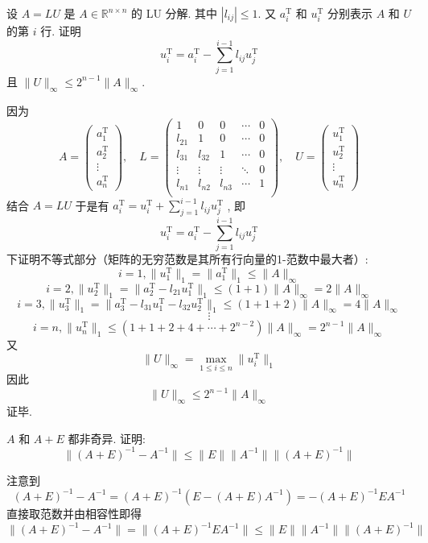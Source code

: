 \documentclass[12pt, answers]{exam}     %
\newcommand{\R}{\mathbb{R}}
\newcommand{\T}{\mathrm{T}}
\begin{document}
\begin{questions}
\question{}
设 \( A = LU \) 是 \( A \in \R^{n \times n} \) 的 LU 分解. 其中 \( |l_{ij}| \leq 1 \). 又 \( a_i^{\T} \) 和 \( u_i^{\T} \) 分别表示 \( A \) 和 \( U \) 的第 \( i \) 行. 证明
\[
u_i^{\T} = a_i^{\T} - \sum_{j=1}^{i-1} l_{ij} u_j^{\T}
\]
且 \( \|U\|_\infty \leq 2^{n-1} \|A\|_\infty \).

\begin{solution}
因为
\[
A = \begin{pmatrix}
a_1^{\T} \\
a_2^{\T} \\
\vdots \\
a_n^{\T}
\end{pmatrix},\quad
L = \begin{pmatrix}
1 & 0 & 0 & \cdots & 0 \\
l_{21} & 1 & 0 & \cdots & 0 \\
l_{31} & l_{32} & 1 & \cdots & 0 \\
\vdots & \vdots & \vdots & \ddots & 0 \\
l_{n1} & l_{n2} & l_{n3} & \cdots & 1 \\
\end{pmatrix},\quad
U = \begin{pmatrix}
u_1^{\T} \\
u_2^{\T} \\
\vdots \\
u_n^{\T}
\end{pmatrix}
\]
结合 \( A = LU \) 于是有
\( a_i^{\T} = u_i^{\T} + \sum_{j=1}^{i-1} l_{ij} u_j^{\T} \)
, 即
\[
u_i^{\T} = a_i^{\T} - \sum_{j=1}^{i-1} l_{ij} u_j^{\T}
\]
下证明不等式部分（矩阵的无穷范数是其所有行向量的1-范数中最大者）:
\[
i = 1, \|u_1^{\T}\|_1 = \|a_1^{\T}\|_1 \leq \|A\|_{\infty}
\]
\[
i = 2, \|u_2^{\T}\|_1 = \|a_2^{\T} - l_{21} u_1^{\T}\|_1 \leq (1+1) \|A\|_{\infty} = 2 \|A\|_{\infty}
\]
\[
i = 3, \|u_3^{\T}\|_1 = \|a_3^{\T} - l_{31} u_1^{\T} - l_{32} u_2^{\T}\|_1 \leq (1+1+2) \|A\|_{\infty} = 4 \|A\|_{\infty}
\]
\[
\vdots
\]
\[
i = n, \|u_n^{\T}\|_1 \leq (1+1+2+4+\cdots+2^{n-2}) \|A\|_{\infty} = 2^{n-1} \|A\|_{\infty}
\]
又
\[
\|U\|_{\infty} = \max_{1 \leq i \leq n}\|u_i^{\T}\|_1
\]
因此
\[
\|U\|_{\infty} \leq 2^{n-1} \|A\|_{\infty}
\]
证毕.
\end{solution}

\question{}
$A$ 和 \( A + E \) 都非奇异. 证明: 
\[
\|(A + E)^{-1} - A^{-1}\| \leq \|E\| \|A^{-1}\| \|(A + E)^{-1}\|
\]

\begin{solution}
注意到
\[ (A + E)^{-1} - A^{-1} = (A + E)^{-1} (E - (A + E) A^{-1}) = -(A + E)^{-1}EA^{-1} \]
直接取范数并由相容性即得
\[ \|(A + E)^{-1} - A^{-1}\| = \| (A + E)^{-1}EA^{-1} \| \leq \|E\| \|A^{-1}\| \|(A + E)^{-1}\| \]  
\end{solution}


\end{questions}
\end{document}
